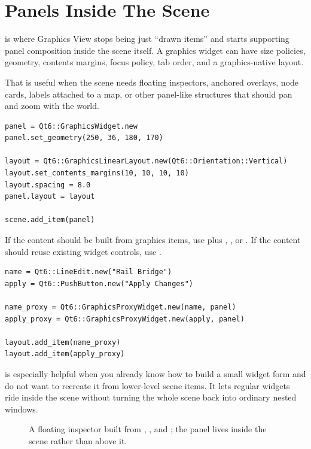 \section{Panels Inside The Scene}

 is where Graphics View stops being just ``drawn items'' and starts supporting panel composition inside the scene itself. A graphics widget can have size policies, geometry, contents margins, focus policy, tab order, and a graphics-native layout.

That is useful when the scene needs floating inspectors, anchored overlays, node cards, labels attached to a map, or other panel-like structures that should pan and zoom with the world.

\begin{lstlisting}[style=crystal]
panel = Qt6::GraphicsWidget.new
panel.set_geometry(250, 36, 180, 170)

layout = Qt6::GraphicsLinearLayout.new(Qt6::Orientation::Vertical)
layout.set_contents_margins(10, 10, 10, 10)
layout.spacing = 8.0
panel.layout = layout

scene.add_item(panel)
\end{lstlisting}

If the content should be built from graphics items, use  plus , , or . If the content should reuse existing widget controls, use .

\begin{lstlisting}[style=crystal]
name = Qt6::LineEdit.new("Rail Bridge")
apply = Qt6::PushButton.new("Apply Changes")

name_proxy = Qt6::GraphicsProxyWidget.new(name, panel)
apply_proxy = Qt6::GraphicsProxyWidget.new(apply, panel)

layout.add_item(name_proxy)
layout.add_item(apply_proxy)
\end{lstlisting}

 is especially helpful when you already know how to build a small widget form and do not want to recreate it from lower-level scene items. It lets regular widgets ride inside the scene without turning the whole scene back into ordinary nested windows.

\begin{figure}[htbp]
  \centering
  \caption{A floating inspector built from , , and ; the panel lives inside the scene rather than above it.}
\end{figure}

